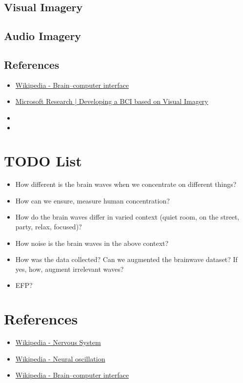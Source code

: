 \subsection{Visual Imagery}
\subsection{Audio Imagery}
\subsection{References}
\begin{itemize}
	\item \href{https://en.wikipedia.org/wiki/Brain%E2%80%93computer_interface}{Wikipedia - Brain–computer interface}
	\item \href{https://youtu.be/LoGBCsFPNzU}{Microsoft Research | Developing a \ac{BCI} based on Visual Imagery}
	\item {}
	\item {}
\end{itemize}

\section{TODO List}
\begin{itemize}
	\item How different is the brain waves when we concentrate on different things?
	\item How can we ensure, measure human concentration?
	\item How do the brain waves differ in varied context (quiet room, on the street, party, relax, focused)?
	\item How noise is the brain waves in the above context?
	\item How was the data collected? Can we augmented the brainwave dataset? If yes, how, augment irrelevant waves?
	\item EFP?	
\end{itemize}

\section{References}
\begin{itemize}
	\item \href{https://en.wikipedia.org/wiki/Nervous_system}{Wikipedia - Nervous System}
	\item \href{https://en.wikipedia.org/wiki/Neural_oscillation}{Wikipedia - Neural oscillation}
	\item \href{https://en.wikipedia.org/wiki/Brain%E2%80%93computer_interface}{Wikipedia - Brain–computer interface}
\end{itemize}